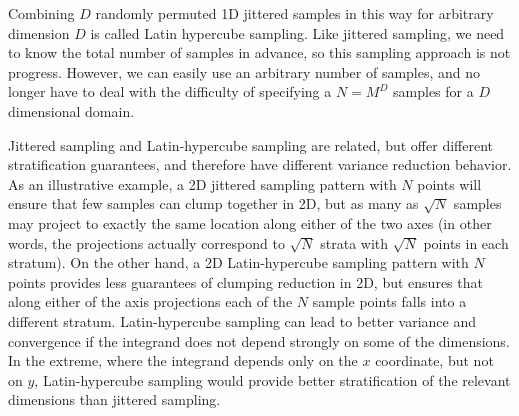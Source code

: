 \documentclass[11pt,fleqn]{book} %
\begin{document}
Combining $D$ randomly permuted 1D jittered samples in this way for arbitrary dimension $D$ is called Latin hypercube sampling. Like jittered sampling, we need to know the total number of samples in advance, so this sampling approach is not progress. However, we can easily use an arbitrary number of samples, and no longer have to deal with the difficulty of specifying a $N = M^D$ samples for a $D$ dimensional domain.

Jittered sampling and Latin-hypercube sampling are related, but offer different stratification guarantees, and therefore have different variance reduction behavior. As an illustrative example, a 2D jittered sampling pattern with $N$ points will ensure that few samples can clump together in 2D, but as many as $\sqrt{N}$ samples may project to exactly the same location along either of the two axes (in other words, the projections actually correspond to $\sqrt{N}$ strata with $\sqrt{N}$ points in each stratum). On the other hand, a 2D Latin-hypercube sampling pattern with $N$ points provides less guarantees of clumping reduction in 2D, but ensures that along either of the axis projections each of the $N$ sample points falls into a different stratum. Latin-hypercube sampling can lead to better variance and convergence if the integrand does not depend strongly on some of the dimensions. In the extreme, where the integrand depends only on the $x$ coordinate, but not on $y$, Latin-hypercube sampling would provide better stratification of the relevant dimensions than jittered sampling.
%
\end{document}
